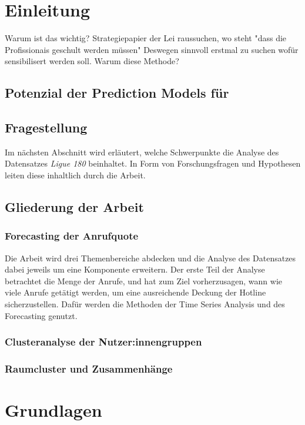 \documentclass[12pt]{report}
\begin{document}
	\renewcommand{\headrulewidth}{0.1 pt}
	\renewcommand{\footrulewidth}{0 pt}
	
	\chapter{Einleitung}
	
	Warum ist das wichtig?
	Strategiepapier der Lei raussuchen, wo steht "dass die Profissionais geschult werden müssen"
	Deswegen sinnvoll erstmal zu suchen wofür sensibilisert werden soll. 
	Warum diese Methode?
	
	
	\section{Potenzial der Prediction Models für} %
	\section{Fragestellung}
	Im nächsten Abschnitt wird erläutert, welche Schwerpunkte die Analyse des Datensatzes \textit{Ligue 180} beinhaltet. In Form von Forschungsfragen und Hypothesen leiten diese inhaltlich durch die Arbeit. 
	\section{Gliederung der Arbeit}
	\subsection{Forecasting der Anrufquote}
	Die Arbeit wird drei Themenbereiche abdecken und die Analyse des Datensatzes dabei jeweils um eine Komponente erweitern. Der erste Teil der Analyse betrachtet die Menge der Anrufe, und hat zum Ziel vorherzusagen, wann wie viele Anrufe getätigt werden, um eine ausreichende Deckung der Hotline sicherzustellen. Dafür werden die Methoden der Time Series Analysis und des Forecasting genutzt. \\
	\subsection{Clusteranalyse der Nutzer:innengruppen}
	\subsection{Raumcluster und Zusammenhänge}
	\chapter{Grundlagen} 
\end{document}
